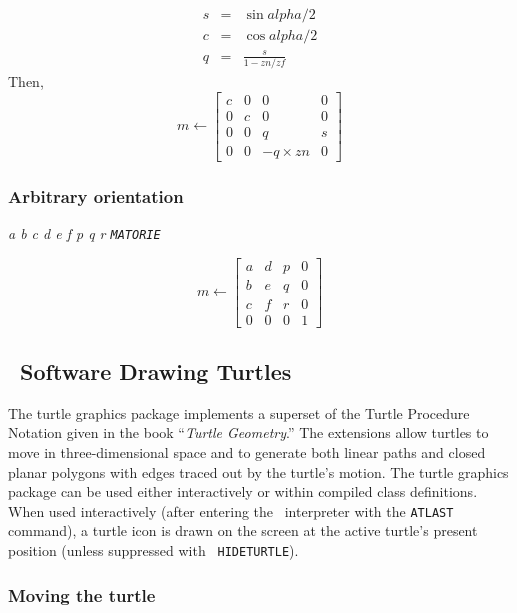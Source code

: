 \documentclass{article}
\begin{document}
\begin{eqnarray*}
        s & =  &\sin \mathit{alpha} / 2\\
        c & =  &\cos \mathit{alpha} / 2\\
        q & = & \frac{s}{1-\mathit{zn}/\mathit{zf}}
\end{eqnarray*}
Then,
\[ m \leftarrow \left[ \begin{array}{cccc}
        c & 0 & 0 & 0 \\
        0 & c & 0 & 0 \\
        0 & 0 & q & s \\
        0 & 0 & -q\times \mathit{zn} & 0
\end{array} \right] \]

\subsubsection{Arbitrary orientation}

{\em a b c d e f p q r {\tt MATORIE}}

\[ m \leftarrow \left[ \begin{array}{cccc}
        a & d & p & 0 \\
        b & e & q & 0 \\
        c & f & r & 0 \\
        0 & 0 & 0 & 1
\end{array} \right] \]

\subsection{\cw\ Software Drawing Turtles}

The turtle graphics package implements a superset of the Turtle
Procedure Notation given in the book ``{\sl Turtle Geometry}.''  The
extensions allow turtles to move in three-dimensional space and to
generate both linear paths and closed planar polygons with edges
traced out by the turtle's motion.  The turtle graphics package can
be used either interactively or within compiled class definitions.
When used interactively (after entering the \atlas\ interpreter with
the {\tt ATLAST} command), a turtle icon is drawn on the screen at the
active turtle's present position (unless suppressed with {\tt
HIDETURTLE}).

\subsubsection{Moving the turtle}
\end{document}
